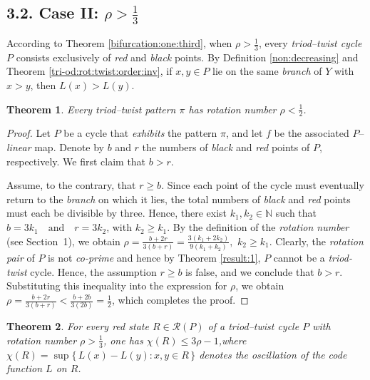 \documentclass[12pt,reqno]{amsart}
\newtheorem{theorem}{Theorem}[section]
\theoremstyle{definition}
\theoremstyle{remark}
\theoremstyle{assumption}
\numberwithin{equation}{section}
\begin{document}
\subsection*{3.2. Case II: $\rho > \tfrac{1}{3}$}

According to Theorem \ref{bifurcation:one:third}, when $\rho >  \tfrac{1}{3}$, every \emph{triod–twist cycle} $P$ consists exclusively of \emph{red} and \emph{black} points.
By Definition \ref{non:decreasing} and Theorem \ref{tri-od:rot:twist:order:inv}, if $x,y\in P$ lie on the same \emph{branch} of $Y$ with $x > y$, then $L(x) >  L(y)$.


\begin{theorem}\label{rho:less:half}
	Every triod--twist pattern $\pi$ has rotation number $\rho < \tfrac12$.
\end{theorem}

\begin{proof}
	Let $P$ be a cycle that \emph{exhibits} the pattern $\pi$, and let $f$ be the associated $P$--\emph{linear} map. Denote by $b$ and $r$ the numbers of \emph{black} and \emph{red} points of $P$, respectively. We first claim that $b>r$.
	
	Assume, to the contrary, that $r \geqslant b$. Since each point of the cycle must eventually return to the \emph{branch} on which it lies, the total numbers of \emph{black} and \emph{red} points must each be divisible by three. Hence, there exist $k_1,k_2 \in \mathbb{N}$ such that	$b = 3k_1 \quad \text{and} \quad r = 3k_2$, with $k_2 \geqslant k_1$. By the definition of the \emph{rotation number} (see Section~1), we obtain $\rho = \frac{b+2r}{3(b+r)} = \frac{3(k_1+2k_2)}{9(k_1+k_2)}, $ $ k_2 \geqslant k_1 $. Clearly, the \emph{rotation pair} of $P$ is not \emph{co-prime} and hence by Theorem \ref{result:1}, $P$ cannot be a \emph{triod-twist} cycle. 
	Hence, the assumption $r \geqslant b$ is false, and we conclude that $b>r$.	Substituting this inequality into the expression for $\rho$, we obtain	$\rho = \frac{b+2r}{3(b+r)} < \frac{b+2b}{3(2b)} = \frac12$, which completes the proof.
\end{proof}



\begin{theorem}\label{red:state:phase:bound}
	For every red state $R \in \mathcal{R}(P)$ of a triod–twist cycle $P$ with rotation number $\rho >  \tfrac{1}{3}$, one has	$\chi(R) \leqslant  3\rho - 1$,where $\chi(R) = \sup\{\,L(x) - L(y) : x, y \in R\,\}$ denotes the oscillation of the code function $L$ on $R$.
\end{theorem}
\end{document}
